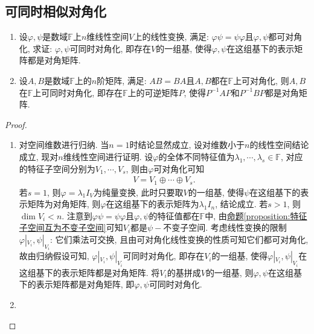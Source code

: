 \documentclass[../../main.tex]{subfiles}
\begin{document}
\subsection{可同时相似对角化}

\begin{proposition}\label{proposition:乘法可交换诱导同时对角化}
\begin{enumerate}
\item 设\(\varphi,\psi\)是数域\(\mathbb{F}\)上\(n\)维线性空间\(V\)上的线性变换, 满足: \(\varphi\psi = \psi\varphi\)且\(\varphi,\psi\)都可对角化, 求证: \(\varphi,\psi\)可同时对角化, 即存在\(V\)的一组基, 使得\(\varphi,\psi\)在这组基下的表示矩阵都是对角矩阵.

\item 设\(A,B\)是数域\(\mathbb{F}\)上的\(n\)阶矩阵, 满足: \(AB = BA\)且\(A,B\)都在\(\mathbb{F}\)上可对角化, 则\(A,B\)在\(\mathbb{F}\)上可同时对角化, 即存在\(\mathbb{F}\)上的可逆矩阵\(P\), 使得\(P^{-1}AP\)和\(P^{-1}BP\)都是对角矩阵.
\end{enumerate}
\end{proposition}
\begin{proof}
\begin{enumerate}
\item 对空间维数进行归纳. 当\(n = 1\)时结论显然成立, 设对维数小于\(n\)的线性空间结论成立, 现对\(n\)维线性空间进行证明. 设\(\varphi\)的全体不同特征值为\(\lambda_{1},\cdots ,\lambda_{s} \in \mathbb{F}\), 对应的特征子空间分别为\(V_{1},\cdots ,V_{s}\), 则由\(\varphi\)可对角化可知
\begin{align*}
V = V_{1}\oplus\cdots\oplus V_{s}.
\end{align*}
若\(s = 1\), 则\(\varphi=\lambda_{1}I_{V}\)为纯量变换, 此时只要取\(V\)的一组基, 使得\(\psi\)在这组基下的表示矩阵为对角矩阵, 则\(\varphi\)在这组基下的表示矩阵为\(\lambda_{1}I_{n}\), 结论成立. 若\(s > 1\), 则\(\dim V_{i}< n\). 注意到\(\varphi\psi = \psi\varphi\)且\(\varphi,\psi\)的特征值都在\(\mathbb{F}\)中, 由\hyperref[proposition:特征子空间互为不变子空间]{命题\ref{proposition:特征子空间互为不变子空间}}可知\(V_{i}\)都是\(\psi -\)不变子空间. 考虑线性变换的限制\(\varphi|_{V_{i}},\psi|_{V_{i}}\): 它们乘法可交换, 且由可对角化线性变换的性质可知它们都可对角化, 故由归纳假设可知, \(\varphi|_{V_{i}},\psi|_{V_{i}}\)可同时对角化, 即存在\(V_{i}\)的一组基, 使得\(\varphi|_{V_{i}},\psi|_{V_{i}}\)在这组基下的表示矩阵都是对角矩阵. 将\(V_{i}\)的基拼成\(V\)的一组基, 则\(\varphi,\psi\)在这组基下的表示矩阵都是对角矩阵, 即\(\varphi,\psi\)可同时对角化.

\item 
\end{enumerate}
\end{proof}
\end{document}
